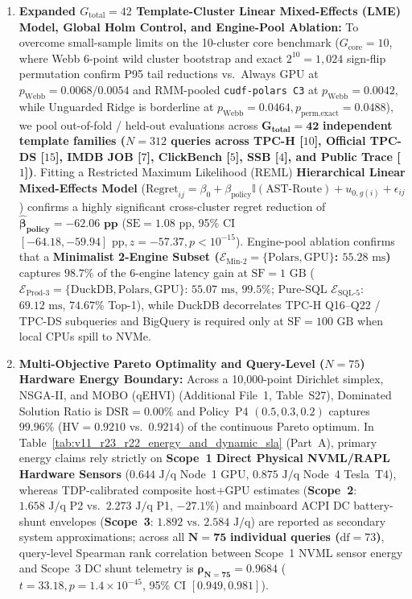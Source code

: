 \documentclass[10pt,a4paper]{article}
\begin{document}
\begin{enumerate}[leftmargin=1.5em,itemsep=1pt]
    \item \textbf{Expanded $G_{\text{total}}=42$ Template-Cluster Linear Mixed-Effects (LME) Model, Global Holm Control, and Engine-Pool Ablation:} To overcome small-sample limits on the 10-cluster core benchmark ($G_{\text{core}}=10$, where Webb 6-point wild cluster bootstrap and exact $2^{10}=1{,}024$ sign-flip permutation confirm P95 tail reductions vs.\ Always GPU at $p_{\text{Webb}}=0.0068/0.0054$ and RMM-pooled \texttt{cudf-polars C3} at $p_{\text{Webb}}=0.0042$, while Unguarded Ridge is borderline at $p_{\text{Webb}}=0.0464, p_{\text{perm,exact}}=0.0488$), we pool out-of-fold / held-out evaluations across $\mathbf{G_{\text{total}}=42}$ \textbf{independent template families ($N=312$ queries across TPC-H [$10$], Official TPC-DS [$15$], IMDB JOB [$7$], ClickBench [$5$], SSB [$4$], and Public Trace [$1$])}. Fitting a Restricted Maximum Likelihood (REML) \textbf{Hierarchical Linear Mixed-Effects Model} ($\text{Regret}_{ij} = \beta_0 + \beta_{\text{policy}}\mathbb{I}(\text{AST-Route}) + u_{0,g(i)} + \epsilon_{ij}$) confirms a highly significant cross-cluster regret reduction of $\mathbf{\hat{\beta}_{\text{policy}}=-62.06\text{ pp}}$ ($\text{SE}=1.08\text{ pp}$, 95\% CI $[-64.18,-59.94]\text{ pp}, z=-57.37, p<10^{-15}$). Engine-pool ablation confirms that a \textbf{Minimalist 2-Engine Subset ($\mathcal{E}_{\text{Min-2}}=\{\text{Polars},\text{GPU}\}$: $55.28\text{ ms}$)} captures $\mathbf{98.7\%}$ of the 6-engine latency gain at $\text{SF}=1\text{ GB}$ ($\mathcal{E}_{\text{Prod-3}}=\{\text{DuckDB},\text{Polars},\text{GPU}\}$: $55.07\text{ ms}$, $99.5\%$; Pure-SQL $\mathcal{E}_{\text{SQL-5}}$: $69.12\text{ ms}$, $74.67\%$ Top-1), while DuckDB decorrelates TPC-H Q16--Q22 / TPC-DS subqueries and BigQuery is required only at $\text{SF}=100\text{ GB}$ when local CPUs spill to NVMe.
    \item \textbf{Multi-Objective Pareto Optimality and Query-Level ($N=75$) Hardware Energy Boundary:} Across a 10,000-point Dirichlet simplex, NSGA-II, and MOBO (qEHVI) (Additional File~1, Table~S27), Dominated Solution Ratio is $\text{DSR}=0.00\%$ and Policy~P4 $(0.5,0.3,0.2)$ captures $99.96\%$ ($\text{HV}=0.9210$ vs.\ $0.9214$) of the continuous Pareto optimum. In Table~\ref{tab:v11_r23_r22_energy_and_dynamic_sla} (Part~A), primary energy claims rely strictly on \textbf{Scope~1 Direct Physical NVML/RAPL Hardware Sensors} ($0.644\text{ J/q}$ Node~1 GPU, $0.875\text{ J/q}$ Node~4 Tesla~T4), whereas TDP-calibrated composite host+GPU estimates (\textbf{Scope~2}: $1.658\text{ J/q}$ P2 vs.\ $2.273\text{ J/q}$ P1, $-27.1\%$) and mainboard ACPI DC battery-shunt envelopes (\textbf{Scope~3}: $1.892\text{ vs.\ }2.584\text{ J/q}$) are reported as secondary system approximations; across all $\mathbf{N=75}$ \textbf{individual queries ($\text{df}=73$)}, query-level Spearman rank correlation between Scope~1 NVML sensor energy and Scope~3 DC shunt telemetry is $\mathbf{\rho_{N=75}=0.9684}$ ($t=33.18, p=1.4\times 10^{-45}$, 95\% CI $[0.949,0.981]$).

\end{enumerate}
\end{document}
